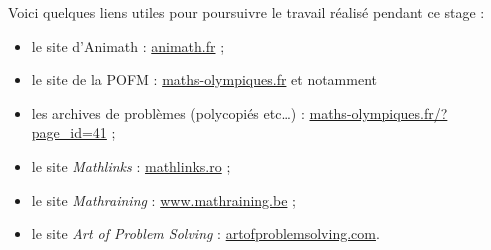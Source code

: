 
\bigskip

Voici quelques liens utiles pour poursuivre le travail réalisé pendant ce stage :
\begin{itemize}
\item le site d'Animath : \href{http://www.animath.fr}{animath.fr} ;
\item le site de la POFM : \href {http://www.maths-olympiques.fr}{maths-olympiques.fr} et notamment 
\item les archives de problèmes (polycopiés etc\ldots) : \href{http://www.maths-olympiques.fr/?page_id=41}{maths-olympiques.fr/?page\_id=41} ;
\item le site \emph{Mathlinks} : \href{http://www.mathlinks.ro}{mathlinks.ro} ;
\item le site \emph{Mathraining} : \href{http://www.mathraining.be}{www.mathraining.be} ;
\item le site \emph{Art of Problem Solving} : \href{https://www.artofproblemsolving.com}{artofproblemsolving.com}.
\end{itemize}

